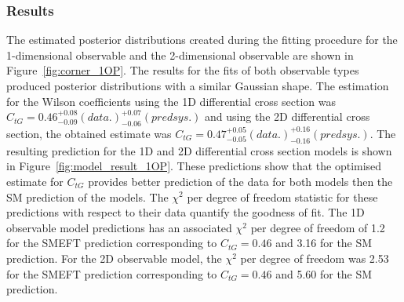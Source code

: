 \documentclass[a4paper,11pt]{article}
\begin{document}
\subsubsection{Results}
The estimated posterior distributions created during the fitting procedure for the 1-dimensional observable and the 2-dimensional observable are shown in Figure~\ref{fig:corner_1OP}.
The results for the fits of both observable types produced posterior distributions with a similar Gaussian shape.
The estimation for the Wilson coefficients using the 1D differential cross section was $C_{tG}=0.46^{+0.08}_{-0.09}(data.)^{+0.07}_{-0.06}(pred sys.)$ and using the 2D differential cross section, the obtained estimate was $C_{tG}=0.47^{+0.05}_{-0.05}(data.)^{+0.16}_{-0.16}(pred sys.)$.
The resulting prediction for the 1D and 2D differential cross section models is shown in Figure~\ref{fig:model_result_1OP}.
These predictions show that the optimised estimate for $C_{tG}$ provides better prediction of the data for both models then the SM prediction of the models.
The $\chi^{2}$ per degree of freedom statistic for these predictions with respect to their data quantify the goodness of fit.
The 1D observable model predictions has an associated $\chi^{2}$ per degree of freedom of 1.2 for the SMEFT prediction corresponding to $C_{tG}=0.46$ and 3.16 for the SM prediction.
For the 2D observable model, the $\chi^{2}$ per degree of freedom was 2.53 for the SMEFT prediction corresponding to $C_{tG}=0.46$ and 5.60 for the SM prediction.
\end{document}
